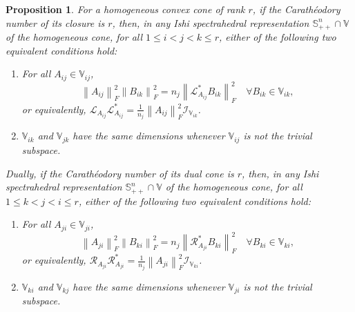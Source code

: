 \documentclass[oneside]{amsart}
\theoremstyle{plain}
\newtheorem{proposition}[theorem]{Proposition}
\theoremstyle{definition}
\theoremstyle{remark}
\numberwithin{equation}{section}
\begin{document}
\begin{proposition}\label{proposition:Caratheodorynumbersnecessary}
For a homogeneous convex cone of rank $r$, if the Carath\'eodory number of
its closure is $r$, then, in any Ishi spectrahedral representation
$\mathbb{S}^{n}_{++} \cap \mathbb{V}$ of the homogeneous cone, for all $1
\leq i < j < k \leq r$, either of the following two equivalent conditions
hold:
\begin{enumerate}[label=(\roman*)]
\item For all $A_{ij} \in \mathbb{V}_{ij}$,
\[
\left\lVert A_{ij}\right\rVert_{F}^{2} \left\lVert
B_{ik}\right\rVert_{F}^{2} = n_{j} \left\lVert \mathcal{L}^{*}_{A_{ij}}
B_{ik}\right\rVert_{F}^{2} \quad \forall B_{ik} \in \mathbb{V}_{ik},
\]
or equivalently, $\mathcal{L}_{A_{ij}} \mathcal{L}^{*}_{A_{ij}} =
\frac{1}{n_{j}} \left\lVert A_{ij}\right\rVert_{F}^{2}
\mathcal{I}_{\mathbb{V}_{ik}}$.

\item $\mathbb{V}_{ik}$ and $\mathbb{V}_{jk}$ have the same dimensions
whenever $\mathbb{V}_{ij}$ is not the trivial subspace.

\end{enumerate}
Dually, if the Carath\'eodory number of its dual cone is $r$, then, in any
Ishi spectrahedral representation $\mathbb{S}^{n}_{++} \cap \mathbb{V}$ of
the homogeneous cone, for all $1 \leq k < j < i \leq r$, either of the
following two equivalent conditions hold:
\begin{enumerate}[label=(\roman*)]
\item For all $A_{ji} \in \mathbb{V}_{ji}$,
\[
\left\lVert A_{ji}\right\rVert_{F}^{2} \left\lVert
B_{ki}\right\rVert_{F}^{2} = n_{j} \left\lVert \mathcal{R}^{*}_{A_{ji}}
B_{ki}\right\rVert_{F}^{2} \quad \forall B_{ki} \in \mathbb{V}_{ki},
\]
or equivalently, $\mathcal{R}_{A_{ji}} \mathcal{R}^{*}_{A_{ji}} =
\frac{1}{n_{j}} \left\lVert A_{ji}\right\rVert_{F}^{2}
\mathcal{I}_{\mathbb{V}_{ki}}$.

\item $\mathbb{V}_{ki}$ and $\mathbb{V}_{kj}$ have the same dimensions
whenever $\mathbb{V}_{ji}$ is not the trivial subspace.

\end{enumerate}
\end{proposition}
\end{document}
